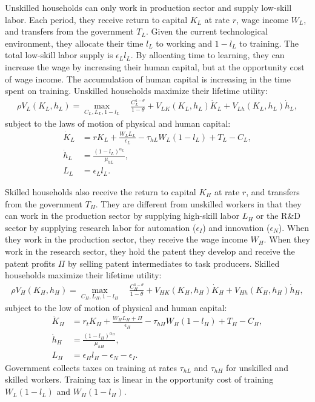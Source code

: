 \documentclass[12pt]{article}
\begin{document}
Unskilled households can only work in production sector and supply low-skill labor. Each period, they receive return to capital $K_L$ at rate $r$, wage income $W_L$, and transfers from the government $T_L$. Given the current technological environment, they allocate their time $l_L$ to working and $1-l_L$ to training. The total low-skill labor supply is $\epsilon_Ll_L$. By allocating time to learning, they can increase the wage by increasing their human capital, but at the opportunity cost of wage income. The accumulation of human capital is increasing in the time spent on training. Unskilled households maximize their lifetime utility: 
\begin{align*}
\rho V_L(K_L,h_L) = \max_{C_L,L_L,1-l_L} \quad \frac{C_L^{1-\theta}}{1-\theta}+V_{LK}(K_L,h_L)\dot{K}_L+V_{Lh}(K_L,h_L)\dot{h}_L,
\end{align*}
subject to the laws of motion of physical and human capital: 
\begin{align*}
\dot{K}_L &=r K_L+\frac{W_LL_L}{\epsilon_L}-\tau_{hL}W_L(1-l_L)+T_L-C_L, \\
\dot{h}_L &= \frac{(1-l_L)^{\alpha_L}}{\mu_{hL}}, \\
L_L &=\epsilon_L l_L.
\end{align*}

Skilled households also receive the return to capital $K_H$ at rate $r$, and transfers from the government $T_H$. They are different from unskilled workers in that they can work in the production sector by supplying high-skill labor $L_H$ or the R\&D sector by supplying research labor for automation ($\epsilon_I$) and innovation ($\epsilon_N$). When they work in the production sector, they receive the wage income $W_H$. When they work in the research sector, they hold the patent they develop and receive the patent profits $\Pi$ by selling patent intermediates to task producers. Skilled households maximize their lifetime utility: 
\begin{align*}
\rho V_H(K_H,h_H) = \max_{C_H,L_H,1-l_H} \quad \frac{C_H^{1-\theta}}{1-\theta}+V_{HK}(K_H,h_H)\dot{K}_H+V_{Hh}(K_H,h_H)\dot{h}_H,
\end{align*}
subject to the low of motion of physical and human capital: 
\begin{align*}
\dot{K}_H &= r_t K_H +\frac{W_H L_H+\Pi}{\epsilon_H}-\tau_{hH}W_H(1-l_H)+T_H-C_H, \\
\dot{h}_H &= \frac{(1-l_H)^{\alpha_H}}{\mu_{hH}}, \\
 L_H&=\epsilon_H l_H-\epsilon_N-\epsilon_I.
\end{align*}
Government collects taxes on training at rates $\tau_{hL}$ and $\tau_{hH}$ for unskilled and skilled workers. Training tax is linear in the opportunity cost of training $W_L(1-l_L)$ and $W_H(1-l_H)$. 
\end{document}
